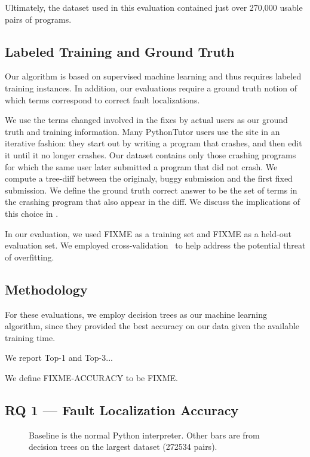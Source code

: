\documentclass[conference]{IEEEtran}
\begin{document}
Ultimately, the dataset used in this evaluation contained just over
270,000 usable pairs of programs.

\subsection{Labeled Training and Ground Truth}

Our algorithm is based on supervised machine learning and thus requires
labeled training instances. In addition, our evaluations require a ground
truth notion of which terms correspond to correct fault localizations.

We use the terms changed involved in the fixes by actual users as our
ground truth and training information.  Many PythonTutor users use the site
in an iterative fashion: they start out by writing a program that crashes,
and then edit it until it no longer crashes. Our dataset contains only
those crashing programs for which the same user later submitted a program
that did not crash. We compute a tree-diff \cite{tree-diff} between the
originaly, buggy submission and the first fixed submission. We define
the ground truth correct answer to be the set of terms in the crashing
program that also appear in the diff. We discuss the implications of this
choice in .

In our evaluation, we used FIXME as a training set and FIXME as a held-out
evaluation set. We employed cross-validation~\cite{kohavi} to help address
the potential threat of overfitting.

\subsection{Methodology}

For these evaluations, we employ decision trees as our machine learning
algorithm, since they provided the best accuracy on our data given the
available training time.

We report Top-1 and Top-3...

We define FIXME-ACCURACY to be FIXME.

\subsection{RQ 1 --- Fault Localization Accuracy}

\begin{figure}
\caption{Baseline is the normal Python interpreter. Other bars are from decision
trees on the largest dataset (272534 pairs).}
\label{fig-full-dataset-acc}
\end{figure}
\end{document}
